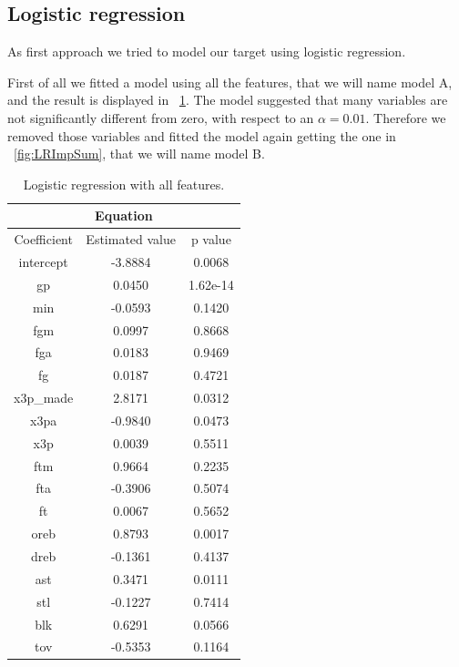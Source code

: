 \subsection{Logistic regression}

As first approach we tried to model our target using logistic regression.

First of all we fitted a model using all the features, that we will name model A, and the result is displayed in \Fig~\ref{table:LRAllSum}. The model suggested that many variables are not significantly different from zero, with respect to an $\alpha = 0.01$. Therefore we removed those variables and fitted the model again getting the one in \Fig~\ref{fig:LRImpSum}, that we will name model B.

\begin{table}[h]
	\begin{subtable}[h]{0.45\textwidth}
		\centering
		\begin{tabular}{||c | c | c ||} 
			\hline
			\multicolumn{3}{|c|}{Equation} \\
			\hline
			Coefficient & Estimated value & p value \\
			\hline
			intercept & -3.8884 & 0.0068 \\
			gp & 0.0450 & 1.62e-14 \\
			min & -0.0593 & 0.1420 \\
			fgm & 0.0997 & 0.8668 \\
			fga & 0.0183 & 0.9469 \\
			fg & 0.0187 & 0.4721 \\
			x3p\_made & 2.8171 & 0.0312 \\
			x3pa & -0.9840 & 0.0473 \\
			x3p & 0.0039 & 0.5511 \\
			ftm & 0.9664 & 0.2235 \\
			fta & -0.3906 & 0.5074 \\
			ft & 0.0067 & 0.5652 \\
			oreb & 0.8793 & 0.0017 \\
			dreb & -0.1361 & 0.4137 \\
			ast & 0.3471 & 0.0111 \\
			stl & -0.1227 & 0.7414 \\
			blk & 0.6291 & 0.0566 \\				
			tov & -0.5353 & 0.1164 \\		
			\hline
		\end{tabular}
		\caption{Logistic regression with all features.}
		\label{table:LRAllSum}
	\end{subtable}

\end{table}
